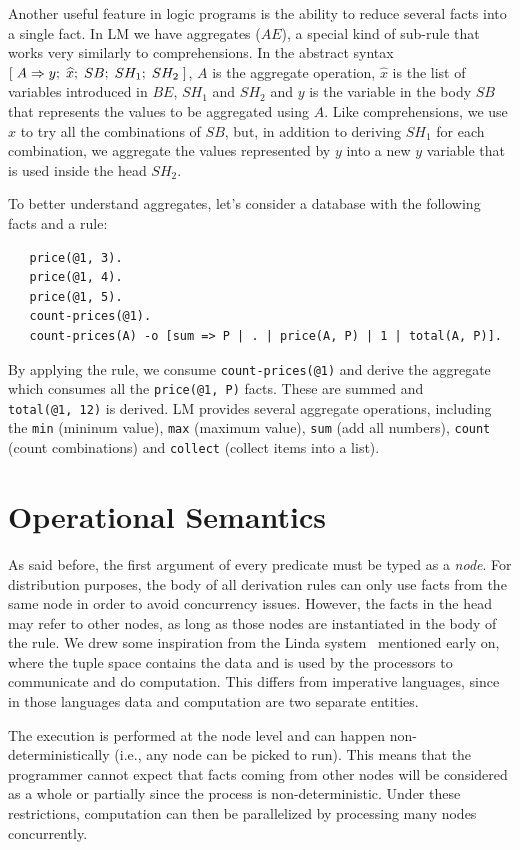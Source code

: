 Another useful feature in logic programs is the ability to reduce several facts
into a single fact.  In LM we have aggregates ($AE$), a special kind of sub-rule
that works very similarly to comprehensions.  In the abstract syntax
$[\; A \Rightarrow y; \; \widehat{x}; \; SB; \; SH_1; \; SH_2 \;]$, $A$ is the aggregate operation,
$\widehat{x}$ is the list of variables introduced in $BE$, $SH_1$ and $SH_2$
and $y$ is the variable in the body $SB$ that represents the values to be
aggregated using $A$. Like comprehensions, we use $\widehat{x}$ to try all
the combinations of $SB$, but, in addition to deriving $SH_1$ for each
combination, we aggregate the values represented by $y$ into a new $y$
variable that is used inside the head $SH_2$.

To better understand aggregates, let's consider a database with the following
facts and a rule:

{\small
\begin{Verbatim}
   price(@1, 3).
   price(@1, 4).
   price(@1, 5).
   count-prices(@1).
   count-prices(A) -o [sum => P | . | price(A, P) | 1 | total(A, P)].
\end{Verbatim}
}

By applying the rule, we consume \texttt{count-prices(@1)} and derive the
aggregate which consumes all the \texttt{price(@1, P)} facts.  These are summed
and \texttt{total(@1,~12)} is derived. LM provides several aggregate operations,
including the \texttt{min} (mininum value), \texttt{max} (maximum value),
\texttt{sum} (add all numbers), \texttt{count} (count combinations) and
\texttt{collect} (collect items into a list).

\section{Operational Semantics}

As said before, the first argument of every predicate must be typed as a
\emph{node}.  For distribution purposes, the body of all derivation rules can
only use facts from the same node in order to avoid concurrency issues.
However, the facts in the head may refer to other nodes, as long as those nodes
are instantiated in the body of the rule.  We drew some inspiration from the
Linda system~\cite{1663305} mentioned early on, where the tuple space contains
the data and is used by the processors to communicate and do computation.  This
differs from imperative languages, since in those languages data and computation
are two separate entities.

The execution is performed at the node level and can happen
non-deterministically (i.e., any node can be picked to run). This means that the
programmer cannot expect that facts coming from other nodes will be considered
as a whole or partially since the process is non-deterministic.  Under these
restrictions, computation can then be parallelized by processing many nodes
concurrently.

